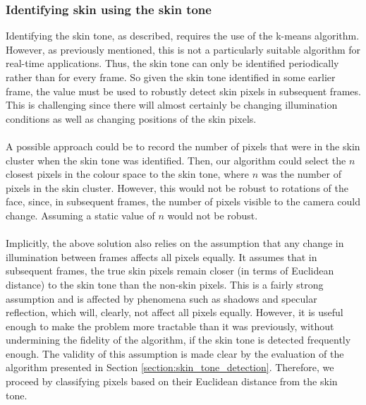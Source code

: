 \subsubsection{Identifying skin using the skin tone}
Identifying the skin tone, as described, requires the use of the k-means algorithm. However, as previously mentioned, this is not a particularly suitable algorithm for real-time applications. Thus, the skin tone can only be identified periodically rather than for every frame. So given the skin tone identified in some earlier frame, the value must be used to robustly detect skin pixels in subsequent frames. This is challenging since there will almost certainly be changing illumination conditions as well as changing positions of the skin pixels.
\\ \\
A possible approach could be to record the number of pixels that were in the skin cluster when the skin tone was identified. Then, our algorithm could select the $n$ closest pixels in the colour space to the skin tone, where $n$ was the number of pixels in the skin cluster. However, this would not be robust to rotations of the face, since, in subsequent frames, the number of pixels visible to the camera could change. Assuming a static value of $n$ would not be robust.
\\ \\
Implicitly, the above solution also relies on the assumption that any change in illumination between frames affects all pixels equally. 
It assumes that in subsequent frames, the true skin pixels remain closer (in terms of Euclidean distance) to the skin tone than the non-skin pixels.
This is a fairly strong assumption and is affected by phenomena such as shadows and specular reflection, which will, clearly, not affect all pixels equally.
However, it is useful enough to make the problem more tractable than it was previously, without undermining the fidelity of the algorithm, if the skin tone is detected frequently enough. 
The validity of this assumption is made clear by the evaluation of the algorithm presented in Section \ref{section:skin_tone_detection}.
Therefore, we proceed by classifying pixels based on their Euclidean distance from the skin tone.
\\ \\
